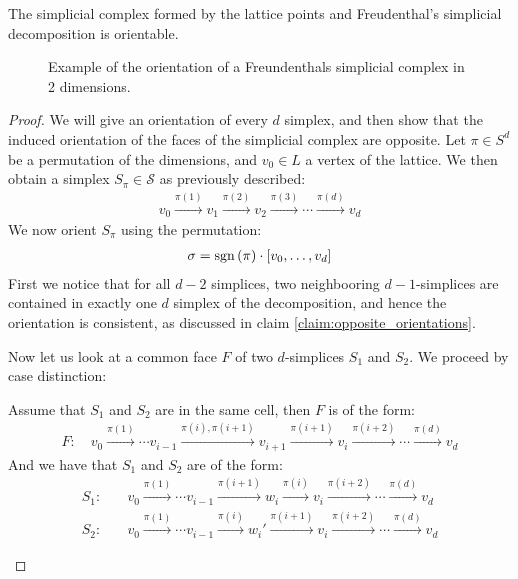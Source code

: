 \begin{claim}
	The simplicial complex formed by the lattice points and Freudenthal's simplicial decomposition is orientable.
\end{claim}

\begin{figure}[ht]
	\centering
	\caption[Orientation of a simplicial complex]{Example of the orientation of a Freundenthals simplicial complex in 2 dimensions.}
	\label{fig:orientation_of_simplicial_complex}
\end{figure}

\begin{proof}
	We will give an orientation of every $d$ simplex, and then show that the induced orientation of the faces of the simplicial complex are opposite.
	Let $\pi \in S^d$ be a permutation of the dimensions, and $v_0 \in L$ a vertex of the lattice. We then obtain a simplex $S_{\pi} \in \mathcal{S}$ as previously described:
	\begin{align*}
		v_0 \xrightarrow{\pi(1)} v_1 \xrightarrow{\pi(2)} v_2 \xrightarrow{\pi(3)} \cdots \xrightarrow{\pi(d)} v_d
	\end{align*}
	We now orient $S_{\pi}$ using the permutation:
	\begin{align*}
		\sigma = \operatorname{sgn}\left(\pi\right) \cdot [v_0, \dots, v_d]
	\end{align*}
	First we notice that for all $d-2$ simplices, two neighbooring $d-1$-simplices are contained  in exactly one $d$ simplex of the decomposition, and hence the orientation is consistent, as discussed in claim \ref{claim:opposite_orientations}. \par
	Now let us look at a common face $F$ of two $d$-simplices $S_1$ and $S_2$. We proceed by case distinction:
	\begin{case}{1}
		Assume that $S_1$ and $S_2$ are in the same cell, then $F$ is of the form:
		\begin{align*}
			F: \quad v_0 \xrightarrow{\pi(1)}  \cdots v_{i-1} \xrightarrow{\pi(i), \pi(i+1)} v_{i+1} \xrightarrow{\pi(i+1)} v_{i} \xrightarrow{\pi(i+2)} \cdots \xrightarrow{\pi(d)} v_d
		\end{align*}
		And we have that $S_1$ and $S_2$ are of the form:
		\begin{align*}
			S_1: \quad & v_0 \xrightarrow{\pi(1)} \cdots v_{i-1} \xrightarrow{\pi(i+1)} w_i \xrightarrow{\pi(i)} v_{i} \xrightarrow{\pi(i+2)} \cdots \xrightarrow{\pi(d)} v_d  \\
			S_2: \quad & v_0 \xrightarrow{\pi(1)} \cdots v_{i-1} \xrightarrow{\pi(i)} w_i' \xrightarrow{\pi(i+1)} v_{i} \xrightarrow{\pi(i+2)} \cdots \xrightarrow{\pi(d)} v_d

\end{align*}
\end{case}
\end{proof}

